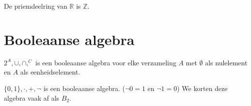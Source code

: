 \documentclass[main.tex]{subfiles}
\begin{document}
\begin{vb}
  De priemdeelring van $\mathbb{R}$ is $\mathbb{Z}$.
\end{vb}

\section{Booleaanse algebra}
\label{sec:booleaanse-algebra}

\begin{vb}
  $2^{A},\cup,\cap,^{C}$ is een booleaanse algebra voor elke verzameling $A$ met $\emptyset$ als nulelement en $A$ als eenheidselement.
\end{vb}

\begin{vb}
  $\{0,1\},\cdot,+,\neg$ is een booleaanse algebra. ($\neg 0 = 1$ en $\neg 1 = 0$)
  We korten deze algebra vaak af als $B_{2}$.
\end{vb}
\end{document}
